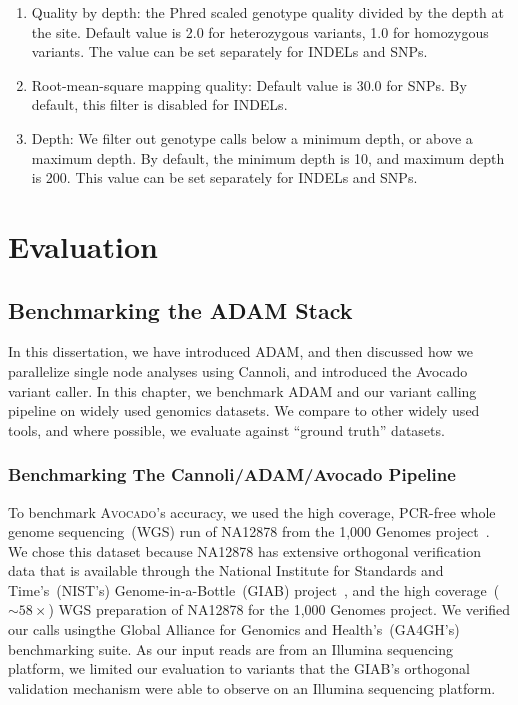 \documentclass[phd]{ucbthesis}
\begin{document}
\begin{enumerate}
\item Quality by depth: the Phred scaled genotype quality divided by the depth at
the site. Default value is 2.0 for heterozygous variants, 1.0 for homozygous
variants. The value can be set separately for INDELs and SNPs.
\item Root-mean-square mapping quality: Default value is 30.0 for SNPs. By default,
this filter is disabled for INDELs.
\item Depth: We filter out genotype calls below a minimum depth, or above a maximum
depth. By default, the minimum depth is 10, and maximum depth is 200. This value
can be set separately for INDELs and SNPs.
\end{enumerate}

\part{Evaluation}

\chapter{Benchmarking the {ADAM} Stack}
\label{chap:benchmarking}

In this dissertation, we have introduced ADAM, and then discussed how we
parallelize single node analyses using Cannoli, and introduced the Avocado
variant caller. In this chapter, we benchmark ADAM and our variant calling
pipeline on widely used genomics datasets. We compare to other widely used
tools, and where possible, we evaluate against ``ground truth'' datasets.

\section{Benchmarking The Cannoli/ADAM/Avocado Pipeline}
\label{sec:end-to-end}

To benchmark \textsc{Avocado}'s accuracy, we used the high coverage, PCR-free
whole genome sequencing~(WGS) run of NA12878 from the 1,000 Genomes
project~\cite{1kg}. We chose this dataset because NA12878 has extensive
orthogonal verification data that is available through the National Institute
for Standards and Time's~(NIST's) Genome-in-a-Bottle~(GIAB)
project~\cite{zook15}, and the high coverage~($\sim58\times$) WGS
preparation of NA12878 for the 1,000 Genomes project. We verified our calls
usingthe Global Alliance for Genomics and Health's~(GA4GH's) benchmarking suite.
As our input reads are from an Illumina sequencing platform, we limited our
evaluation to variants that the GIAB's orthogonal validation mechanism were
able to observe on an Illumina sequencing platform.
\end{document}
